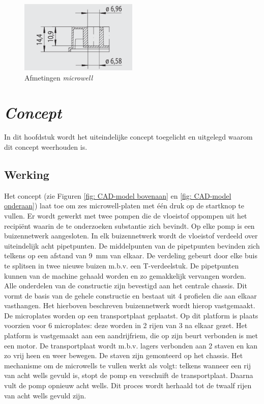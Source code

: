 \documentclass[a4paper,twoside,kulak]{kulakreport} %
\begin{document}
\begin{figure}[h]
	\centering
	\includegraphics[width=0.5\textwidth]{AfmetingenMicrowell.png}
	\caption{Afmetingen \textit{microwell}}
	\label{fig: afmetingenMicrowellplaat}
	
\end{figure} 


\chapter{\textit{Concept}} 


In dit hoofdstuk wordt het uiteindelijke concept toegelicht en uitgelegd waarom dit concept weerhouden is.

\section{Werking}

	Het concept (zie Figuren \ref{fig: CAD-model bovenaan} en \ref{fig: CAD-model onderaan}) laat toe om zes microwell-platen met één druk op de startknop te vullen. Er wordt gewerkt met twee pompen die de vloeistof oppompen uit het recipiënt waarin de te onderzoeken substantie zich bevindt. Op elke pomp is een buizennetwerk aangesloten. In elk buizennetwerk wordt de vloeistof verdeeld over uiteindelijk acht pipetpunten. De middelpunten van de pipetpunten bevinden zich telkens op een afstand van \SI{9}{mm} van elkaar. De verdeling gebeurt door elke buis te splitsen in twee nieuwe buizen m.b.v. een T-verdeelstuk. De pipetpunten kunnen van de machine gehaald worden en zo gemakkelijk vervangen worden.
	\newline
	Alle onderdelen van de constructie zijn bevestigd aan het centrale chassis. Dit vormt de basis van de gehele constructie en bestaat uit 4 profielen die aan elkaar vasthangen. Het hierboven beschreven buizennetwerk wordt hierop vastgemaakt.
	De microplates worden op een transportplaat geplaatst. Op dit platform is plaats voorzien voor 6 microplates: deze worden in 2 rijen van 3 na elkaar gezet. Het platform is vastgemaakt aan een aandrijfriem, die op zijn beurt verbonden is met een motor. De transportplaat wordt m.b.v. lagers verbonden aan 2 staven en kan zo vrij heen en weer bewegen. De staven zijn gemonteerd op het chassis.
	\newline
	Het mechanisme om de microwells te vullen werkt als volgt: telkens wanneer een rij van acht wells gevuld is, stopt de pomp en verschuift de transportplaat. Daarna vult de pomp opnieuw acht wells. Dit proces wordt herhaald tot de twaalf rijen van acht wells gevuld zijn. 
	
\end{document}
